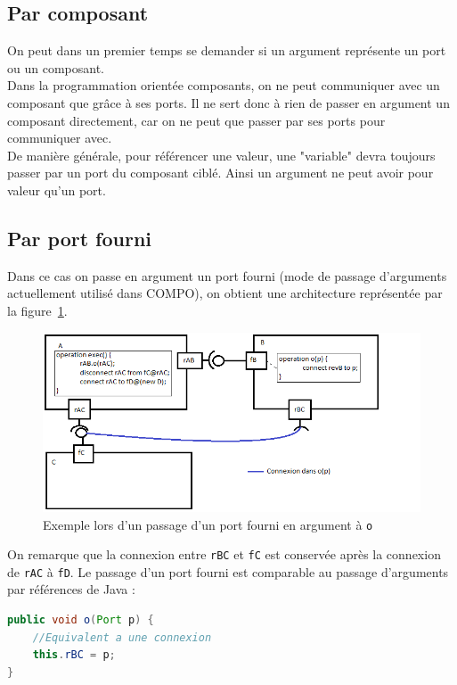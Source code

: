 \documentclass[11pt,a4paper,openany,oneside]{book}
\begin{document}
\subsection{Par composant}
On peut dans un premier temps se demander si un argument représente un port ou un composant.\\
Dans la programmation orientée composants, on ne peut communiquer avec un composant que grâce à ses ports. Il ne sert donc à rien de passer en argument un composant directement, car on ne peut que passer par ses ports pour communiquer avec.\\
De manière générale, pour référencer une valeur, une "variable" devra toujours passer par un port du composant ciblé. Ainsi un argument ne peut avoir pour valeur qu'un port.

\subsection{Par port fourni}
\label{passageFourni}

Dans ce cas on passe en argument un port fourni (mode de passage d'arguments actuellement utilisé dans COMPO), on obtient une architecture représentée par la figure~\ref{exempleFourni}.\\
\begin{figure}[H]
\centering
\includegraphics[scale=0.7, keepaspectratio=true]{exempleFourni_1.png}
\caption{Exemple lors d'un passage d'un port fourni en argument à \texttt{o}}
\label{exempleFourni}
\end{figure}
On remarque que la connexion entre \texttt{rBC} et \texttt{fC} est conservée après la connexion de \texttt{rAC} à \texttt{fD}.
Le passage d'un port fourni est comparable au passage d'arguments par références de Java : 
\begin{lstlisting}[language=Java, caption=Equivalent en Java d'un passage de port fourni en paramètre de \texttt{o}]
public void o(Port p) {
    //Equivalent a une connexion
    this.rBC = p;    
}
\end{lstlisting}
\end{document}
